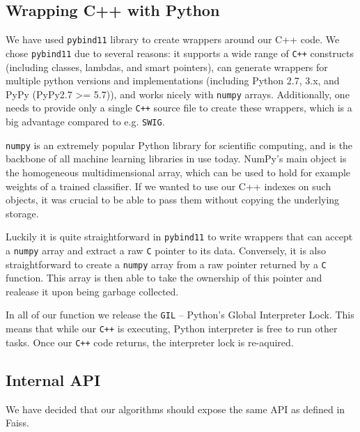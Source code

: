 \subsection{Wrapping C++ with Python}

We have used \texttt{pybind11}\cite{pybind11} library to create wrappers around our C++ code. We chose \texttt{pybind11}
due to several reasons: it supports a wide range of \texttt{C++} constructs
(including classes, lambdas, and smart pointers), can generate wrappers for multiple python versions and
implementations (including Python 2.7, 3.x, and PyPy (PyPy2.7 >= 5.7)), and works nicely with \texttt{numpy} arrays.
Additionally, one needs to provide only a single \texttt{C++} source file to create these wrappers, which is
a big advantage compared to e.g. \texttt{SWIG}.

\texttt{numpy} is an extremely popular Python library for scientific computing, and is the backbone of all
machine learning libraries in use today. NumPy’s main object is the homogeneous multidimensional array, which
can be used to hold for example weights of a trained classifier. If we wanted to use our C++ indexes on such
objects, it was crucial to be able to pass them without copying the underlying storage.

Luckily it is quite straightforward in \texttt{pybind11} to write wrappers that can accept a \texttt{numpy} array
and extract a raw \texttt{C} pointer to its data. Conversely, it is also straightforward to create
a \texttt{numpy} array from a raw pointer returned by a \texttt{C} function. This array is then able to take the
ownership of this pointer and realease it upon being garbage collected.

In all of our function we release the \texttt{GIL} -- Python's Global Interpreter Lock. This means that while our
\texttt{C++} is executing, Python interpreter is free to run other tasks. Once our \texttt{C++} code returns, the
interpreter lock is re-aquired.

\subsection{Internal API}

We have decided that our algorithms should expose the same API as defined in Faiss.

